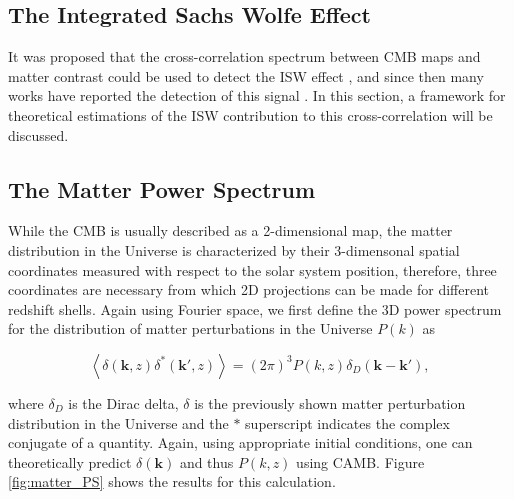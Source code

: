\documentclass[openany,a4paper,12pt,oneside]{book}
\newcommand{\av}[1]{\left\langle #1 \right\rangle} %
\begin{document}
\begin{spacing}{1.5}
\section{The Integrated Sachs Wolfe Effect}\label{ch2:ISW_effect_section}

It was proposed that the cross-correlation spectrum between CMB maps and matter contrast could be used to detect the ISW effect \cite{Turok96}, and since then many works have reported the detection of this signal \cite{cross_corr:Afshordi, cross_corr:Crittenden2005a, cross_corr:Crittenden2005b, cross_corr:Planck}. In this section, a framework for theoretical estimations of the ISW contribution to this cross-correlation will be discussed.

\subsection{The Matter Power Spectrum}

While the CMB is usually described as a 2-dimensional map, the matter distribution in the Universe is characterized by their 3-dimensonal spatial coordinates measured with respect to the solar system position, therefore, three coordinates are necessary from which 2D projections can be made for different redshift shells. Again using Fourier space, we first define the 3D power spectrum for the distribution of matter perturbations in the Universe $P(k)$ as

\begin{equation}\label{def:P(k)}
    \av{\delta(\mathbf{k}, z) \delta^*(\mathbf{k}', z)}=(2\pi)^3 P(k,z) \delta_D(\mathbf{k}-\mathbf{k}'),
\end{equation}

\noindent where $\delta_D$ is the Dirac delta, $\delta$ is the previously shown matter perturbation distribution in the Universe and the $*$ superscript indicates the complex conjugate of a quantity. Again, using appropriate initial conditions, one can theoretically predict $\delta(\mathbf{k})$ and thus $P(k,z)$ using CAMB. Figure \ref{fig:matter_PS} shows the results for this calculation.  


\end{spacing}
\end{document}
